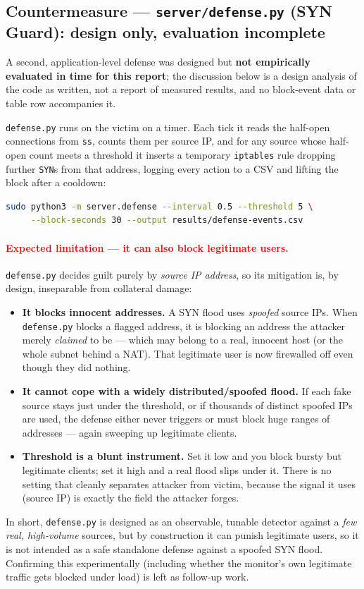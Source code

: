 \documentclass[11pt,a4paper]{article}
\begin{document}
\subsection{Countermeasure --- \texttt{server/defense.py} (SYN Guard): design only, evaluation incomplete}
\label{sec:def2}
A second, application-level defense was designed but \textbf{not empirically
evaluated in time for this report}; the discussion below is a design analysis
of the code as written, not a report of measured results, and no block-event
data or table row accompanies it.

\texttt{defense.py} runs on the victim on a timer. Each tick it reads the
half-open connections from \texttt{ss}, counts them per source IP, and for any
source whose half-open count meets a threshold it inserts a temporary
\texttt{iptables} rule dropping further \texttt{SYN}s from that address, logging
every action to a CSV and lifting the block after a cooldown:
\begin{lstlisting}[language=bash]
sudo python3 -m server.defense --interval 0.5 --threshold 5 \
     --block-seconds 30 --output results/defense-events.csv
\end{lstlisting}

\paragraph{\textcolor{red}{Expected limitation --- it can also block
legitimate users.}} \texttt{defense.py} decides guilt purely by \emph{source
IP address}, so its mitigation is, by design, inseparable from collateral
damage:
\begin{itemize}[nosep]
  \item \textbf{It blocks innocent addresses.} A SYN flood uses \emph{spoofed}
    source IPs. When \texttt{defense.py} blocks a flagged address, it is blocking
    an address the attacker merely \emph{claimed} to be --- which may belong to a
    real, innocent host (or the whole subnet behind a NAT). That legitimate user
    is now firewalled off even though they did nothing.
  \item \textbf{It cannot cope with a widely distributed/spoofed flood.} If each
    fake source stays just under the threshold, or if thousands of distinct
    spoofed IPs are used, the defense either never triggers or must block huge
    ranges of addresses --- again sweeping up legitimate clients.
  \item \textbf{Threshold is a blunt instrument.} Set it low and you block bursty
    but legitimate clients; set it high and a real flood slips under it. There is
    no setting that cleanly separates attacker from victim, because the signal it
    uses (source IP) is exactly the field the attacker forges.
\end{itemize}
In short, \texttt{defense.py} is designed as an observable, tunable detector
against a \emph{few real, high-volume} sources, but by construction it can
punish legitimate users, so it is not intended as a safe standalone defense
against a spoofed SYN flood. Confirming this experimentally (including
whether the monitor's own legitimate traffic gets blocked under load) is
left as follow-up work.
\end{document}
